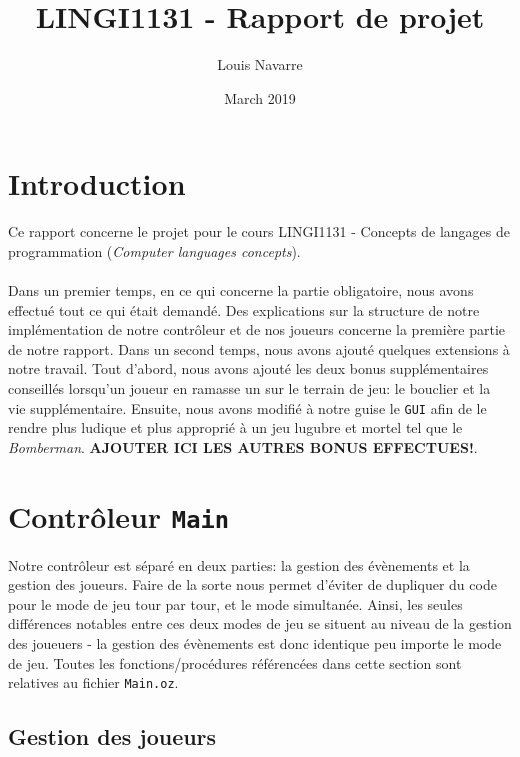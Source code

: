 \documentclass{article}
\title{LINGI1131 - Rapport de projet}
\author{Louis Navarre}
\date{March 2019}
\begin{document}
\maketitle

\section{Introduction}
Ce rapport concerne le projet pour le cours LINGI1131 - Concepts de langages de programmation (\emph{Computer languages concepts}). \\ \\
Dans un premier temps, en ce qui concerne la partie obligatoire, nous avons effectué tout ce qui était demandé. Des explications sur la structure de notre implémentation de notre contrôleur et de nos joueurs concerne la première partie de notre rapport. Dans un second temps, nous avons ajouté quelques extensions à notre travail. Tout d'abord, nous avons ajouté les deux bonus supplémentaires conseillés lorsqu'un joueur en ramasse un sur le terrain de jeu: le bouclier et la vie supplémentaire. Ensuite, nous avons modifié à notre guise le \texttt{GUI} afin de le rendre plus ludique et plus approprié à un jeu lugubre et mortel tel que le \emph{Bomberman}. \textbf{AJOUTER ICI LES AUTRES BONUS EFFECTUES!}.

\section{Contrôleur \texttt{Main}}
Notre contrôleur est séparé en deux parties: la gestion des évènements et la gestion des joueurs. Faire de la sorte nous permet d'éviter de dupliquer du code pour le mode de jeu tour par tour, et le mode simultanée. Ainsi, les seules différences notables entre ces deux modes de jeu se situent au niveau de la gestion des joueuers - la gestion des évènements est donc identique peu importe le mode de jeu. Toutes les fonctions/procédures référencées dans cette section sont relatives au fichier \texttt{Main.oz}.
\subsection{Gestion des joueurs}
\end{document}
